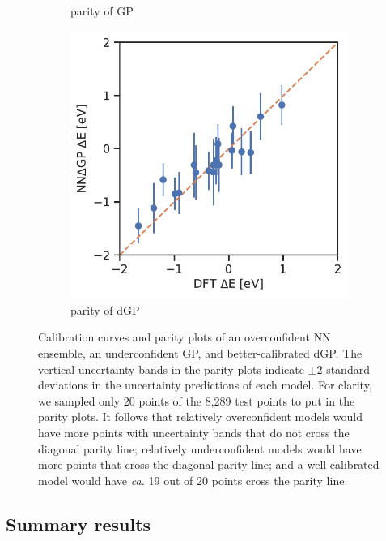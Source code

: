 \documentclass[]{achemso}
\begin{document}
\begin{figure}
\begin{subfigure}[b]{0.32\textwidth}
        \caption{parity of \gls{GP}}\label{fig:error_bar_gp}
    \end{subfigure}
    \begin{subfigure}[b]{0.32\textwidth}
        \includegraphics[width=\textwidth]{../NNdGP/Matern/error_bar_parity.pdf}
        \caption{parity of \gls{dGP}}\label{fig:error_bar_pfgp}
    \end{subfigure}
    \caption{Calibration curves and parity plots of an overconfident \gls{NN} ensemble, an underconfident \gls{GP}, and better-calibrated \gls{dGP}.
    The vertical uncertainty bands in the parity plots indicate $\pm$2 standard deviations in the uncertainty predictions of each model.
    For clarity, we sampled only 20 points of the 8,289 test points to put in the parity plots.
    It follows that relatively overconfident models would have more points with uncertainty bands that do not cross the diagonal parity line;
    relatively underconfident models would have more points that cross the diagonal parity line;
    and a well-calibrated model would have \textit{ca.} 19 out of 20 points cross the parity line.}\label{fig:error_bars}
\end{figure}

\subsection{Summary results}
\end{document}
